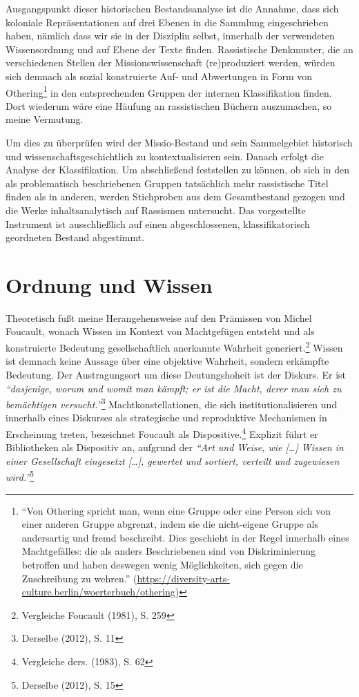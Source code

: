 \documentclass[a4paper,
fontsize=11pt,
oneside,
numbers=noperiodatend,
parskip=half-,
bibliography=totoc,
final
]{scrartcl}
\begin{document}
Ausgangspunkt dieser historischen Bestandsanalyse ist die Annahme, dass
sich koloniale Repräsentationen auf drei Ebenen in die Sammlung
eingeschrieben haben, nämlich dass wir sie in der Disziplin selbst,
innerhalb der verwendeten Wissensordnung und auf Ebene der Texte finden.
Rassistische Denkmuster, die an verschiedenen Stellen der
Missionswissenschaft (re)pro\-duziert werden, würden sich demnach als
sozial konstruierte Auf- und Abwertungen in Form von Othering\footnote{\enquote{Von
  Othering spricht man, wenn eine Gruppe oder eine Person sich von einer
  anderen Gruppe abgrenzt, indem sie die nicht-eigene Gruppe als
  andersartig und fremd beschreibt. Dies geschieht in der Regel
  innerhalb eines Machtgefälles: die als anders Beschriebenen sind von
  Diskriminierung betroffen und haben deswegen wenig Möglichkeiten, sich
  gegen die Zuschreibung zu wehren.}
  (\url{https://diversity-arts-culture.berlin/woerterbuch/othering})} in den
entsprechenden Gruppen der internen Klassifikation finden. Dort wiederum
wäre eine Häufung an rassistischen Büchern auszumachen, so meine
Vermutung.

Um dies zu überprüfen wird der Missio-Bestand und sein Sammelgebiet
historisch und wissenschaftsgeschichtlich zu kontextualisieren sein.
Danach erfolgt die Analyse der Klassifikation. Um abschließend
feststellen zu können, ob sich in den als problematisch beschriebenen
Gruppen tatsächlich mehr rassistische Titel finden als in anderen,
werden Stichproben aus dem Gesamtbestand gezogen und die Werke
inhaltsanalytisch auf Rassismen untersucht. Das vorgestellte Instrument
ist ausschließlich auf einen abgeschlossenen, klassifikatorisch
geordneten Bestand abgestimmt.

\hypertarget{ordnung-und-wissen}{%
\section{Ordnung und Wissen}\label{ordnung-und-wissen}}

Theoretisch fußt meine Herangehensweise auf den Prämissen von Michel
Foucault, wonach Wissen im Kontext von Machtgefügen entsteht und als
konstruierte Bedeutung gesellschaftlich anerkannte Wahrheit
generiert.\footnote{Vergleiche Foucault (1981), S. 259} Wissen ist
demnach keine Aussage über eine objektive Wahrheit, sondern erkämpfte
Bedeutung. Der Austragungsort um diese Deutungshoheit ist der Diskurs.
Er ist \emph{\enquote{dasjenige, worum und womit man kämpft; er ist die
Macht, derer man sich zu bemächtigen versucht.}}\footnote{Derselbe
  (2012), S. 11} Machtkonstellationen, die sich institutionalisieren und
innerhalb eines Diskurses als strategische und reproduktive Mechanismen
in Erscheinung treten, bezeichnet Foucault als Dispositive.\footnote{Vergleiche
  ders. (1983), S. 62} Explizit führt er Bibliotheken als Dispositiv an,
aufgrund der \emph{\enquote{Art und Weise, wie {[}\ldots{]} Wissen in
einer Gesellschaft eingesetzt {[}\ldots{]}, gewertet und sortiert,
verteilt und zugewiesen wird.}}\footnote{Derselbe (2012), S. 15}
\end{document}
